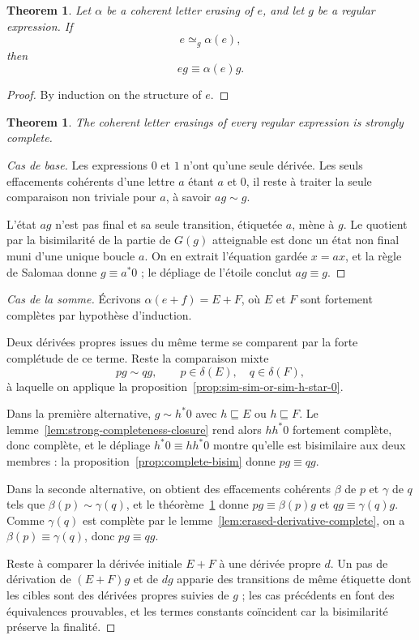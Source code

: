 \documentclass{article}
\newtheorem{theorem}[definition]{Theorem}
\begin{document}
\begin{theorem}\label{thm:special-erasing}
  Let $\alpha$ be a coherent letter erasing of $e$, and let $g$ be a regular
  expression. If
  \[
    e{\simeq_g}\alpha(e),
  \]
  then
  \[
    eg\equiv\alpha(e)g.
  \]
\end{theorem}

\begin{proof}
By induction on the structure of $e$.
\end{proof}

\begin{theorem}
The coherent letter erasings of every regular expression is strongly complete.
\end{theorem}

\begin{proof}[Cas de base]
Les expressions $0$ et $1$ n'ont qu'une seule dérivée. Les seuls effacements
cohérents d'une lettre $a$ étant $a$ et $0$, il reste à traiter la seule
comparaison non triviale pour $a$, à savoir $ag\sim g$.

L'état $ag$ n'est pas final et sa seule transition, étiquetée $a$, mène à $g$.
Le quotient par la bisimilarité de la partie de $G(g)$ atteignable est donc un
état non final muni d'une unique boucle $a$. On en extrait l'équation gardée
$x=ax$, et la règle de Salomaa donne $g\equiv a^*0$ ; le dépliage de l'étoile
conclut $ag\equiv g$.
\end{proof}

\begin{proof}[Cas de la somme]
Écrivons $\alpha(e+f)=E+F$, où $E$ et $F$ sont fortement complètes par
hypothèse d'induction.

Deux dérivées propres issues du même terme se comparent par la forte complétude
de ce terme. Reste la comparaison mixte
\[
  pg\sim qg,\qquad p\in\delta(E),\quad q\in\delta(F),
\]
à laquelle on applique la proposition~\ref{prop:sim-sim-or-sim-h-star-0}.

Dans la première alternative, $g\sim h^*0$ avec $h\sqsubseteq E$ ou
$h\sqsubseteq F$. Le lemme~\ref{lem:strong-completeness-closure} rend alors
$hh^*0$ fortement complète, donc complète, et le dépliage $h^*0\equiv hh^*0$
montre qu'elle est bisimilaire aux deux membres : la
proposition~\ref{prop:complete-bisim} donne $pg\equiv qg$.

Dans la seconde alternative, on obtient des effacements cohérents $\beta$ de
$p$ et $\gamma$ de $q$ tels que $\beta(p)\sim\gamma(q)$, et le
théorème~\ref{thm:special-erasing} donne $pg\equiv\beta(p)g$ et
$qg\equiv\gamma(q)g$. Comme $\gamma(q)$ est complète par le
lemme~\ref{lem:erased-derivative-complete}, on a $\beta(p)\equiv\gamma(q)$,
donc $pg\equiv qg$.

Reste à comparer la dérivée initiale $E+F$ à une dérivée propre $d$. Un pas de
dérivation de $(E+F)g$ et de $dg$ apparie des transitions de même étiquette
dont les cibles sont des dérivées propres suivies de $g$ ; les cas précédents en
font des équivalences prouvables, et les termes constants coïncident car la
bisimilarité préserve la finalité.
\end{proof}
\end{document}
